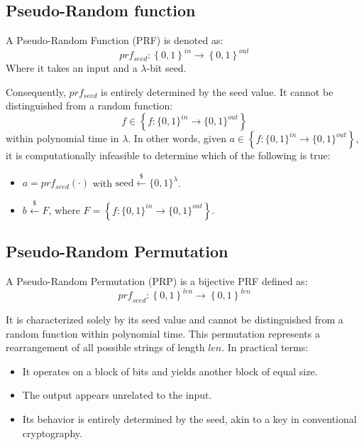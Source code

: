 \subsection{Pseudo-Random function}
\begin{definition}
    A Pseudo-Random Function (PRF) is denoted as: 
    \[prf_{seed}:\left\{ 0,1 \right\}^{in} \rightarrow \left\{ 0,1 \right\}^{out}\]
    Where it takes an input and a $\lambda$-bit seed.
\end{definition}
Consequently, $prf_{seed}$ is entirely determined by the seed value.
It cannot be distinguished from a random function: 
\[ f \in \left\{ f:\{ 0,1 \}^{in} \rightarrow \{ 0,1 \}^{out}\right\}\]
within polynomial time in $\lambda$.
In other words, given $a \in \left\{ f:\{ 0,1 \}^{in} \rightarrow \{ 0,1 \}^{out}\right\}$, it is computationally infeasible to determine which of the following is true:
\begin{itemize}
    \item $a=prf_{seed}(\cdot)$ with $\text{seed}\overset{\$}{\leftarrow}\{0,1\}^\lambda$. 
    \item $b\overset{\$}{\leftarrow}F$, where $F=\left\{ f:\{ 0,1 \}^{in} \rightarrow \{ 0,1 \}^{out}\right\}$.
\end{itemize}

\subsection{Pseudo-Random Permutation}
\begin{definition}
    A Pseudo-Random Permutation (PRP) is a bijective PRF defined as:
    \[{prf}_{seed}:\left\{ 0,1 \right\}^{len}\rightarrow\left\{ 0,1 \right\}^{len}\]
\end{definition}
It is characterized solely by its seed value and cannot be distinguished from a random function within polynomial time.
This permutation represents a rearrangement of all possible strings of length $len$.
In practical terms:
\begin{itemize}
    \item It operates on a block of bits and yields another block of equal size.
    \item The output appears unrelated to the input.
    \item Its behavior is entirely determined by the seed, akin to a key in conventional cryptography.
\end{itemize}

